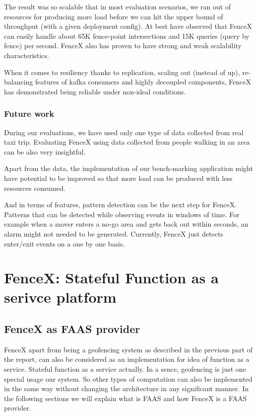 \documentclass[a4]{report}
\begin{document}
    The result was so scalable that in most evaluation scenarios, we ran out of resources for producing more load
    before we can hit the upper bound of throughput (with a given deployment config).
    At best have observed that FenceX can easily handle about 65K fence-point intersections and 15K queries (query by
    fence) per second.
    FenceX also has proven to have strong and weak scalability characteristics.

    When it comes to resiliency thanks to replication, scaling out (instead of up), re-balancing features of kafka
    consumers and highly decoupled components, FenceX has demonstrated being reliable under non-ideal conditions.


    \section{Future work}
    During our evaluations, we have used only one type of data collected from real taxi trip.
    Evaluating FenceX using data collected from people walking in an area can be also very insightful.

    Apart from the data, the implementation of our bench-marking application might have potential to be improved so
    that more load can be produced with less resources consumed.

    And in terms of features, pattern detection can be the next step for FenceX.
    Patterns that can be detected while observing events in windows of time.
    For example when a mover enters a no-go area and gets back out within seconds, an alarm might not needed to be
    generated.
    Currently, FenceX just detects enter/exit events on a one by one basis.


    \part[Stateful FAAS]{FenceX: Stateful Function as a serivce platform}


    \chapter{FenceX as FAAS provider}
    FenceX apart from being a geofencing system as described in the previous part of the report, can also be
    considered as an implementation for idea of function as a service.
    Stateful function as a service actually.
    In a sence, geofencing is just one special usage our system.
    So other types of computation can also be implemented in the same way without changing the architecture in any
    significant manner.
    In the following sections we will explain what is FAAS and how FenceX is a FAAS provider.
\end{document}
